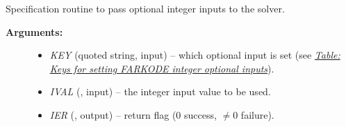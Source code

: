\documentclass[letterpaper,10pt,english]{sphinxmanual}
\begin{document}
\begin{fulllineitems}
\label{f_interface/Usage:f/_/FARKSETIIN}
Specification routine to pass optional integer inputs
to the {\hyperref[f_interface/Usage:f/_/FARKODE]{}} solver.
\begin{description}
\item[{\textbf{Arguments:}}] \leavevmode\begin{itemize}
\item {} 
\emph{KEY} (quoted string, input) -- which optional input
is set (see {\hyperref[f_interface/Usage:finterface-iinoptiontable]{\emph{Table: Keys for setting FARKODE integer optional inputs}}}).

\item {} 
\emph{IVAL} (, input) -- the integer input value to be used.

\item {} 
\emph{IER} (, output) -- return flag (0 success, $\ne 0$ failure).

\end{itemize}

\end{description}

\end{fulllineitems}
\end{document}
